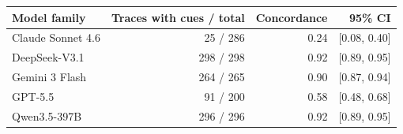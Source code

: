 \begin{tabular}{lrrr}
\toprule
Model family & Traces with cues / total & Concordance & 95\% CI \\
\midrule
Claude Sonnet 4.6 & 25 / 286 & 0.24 & [0.08, 0.40] \\
DeepSeek-V3.1 & 298 / 298 & 0.92 & [0.89, 0.95] \\
Gemini 3 Flash & 264 / 265 & 0.90 & [0.87, 0.94] \\
GPT-5.5 & 91 / 200 & 0.58 & [0.48, 0.68] \\
Qwen3.5-397B & 296 / 296 & 0.92 & [0.89, 0.95] \\
\bottomrule
\end{tabular}